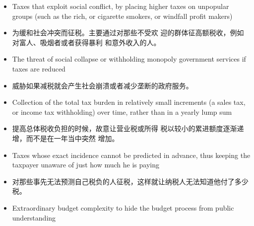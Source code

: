 \begin{paracol}{2}
\begin{itemize}
\end{itemize}
\switchcolumn*
\begin{itemize}
	\item Taxes that exploit social conflict, by placing higher taxes
	on unpopular groups (such as the rich, or cigarette smokers, or windfall profit makers)
\end{itemize}
\switchcolumn
\begin{itemize}
	\item 为缓和社会冲突而征税。主要通过对那些不受欢
	迎的群体征高额税收，例如对富人、吸烟者或者获得暴利
	和意外收入的人。
\end{itemize}
\switchcolumn*
\begin{itemize}
	\item The threat of social collapse or withholding monopoly
	government services if taxes are reduced
\end{itemize}
\switchcolumn
\begin{itemize}
	\item 威胁如果减税就会产生社会崩溃或者减少垄断的政府服务。
\end{itemize}
\switchcolumn*
\begin{itemize}
	\item Collection of the total tax burden in relatively small increments (a sales tax, or income tax withholding) over time,
	rather than in a yearly lump sum
\end{itemize}
\switchcolumn
\begin{itemize}
	\item 提高总体税收负担的时候，故意让营业税或所得
	税以较小的累进额度逐渐递增，而不是在一年当中突然
	增加。
\end{itemize}
\switchcolumn*
\begin{itemize}
	\item Taxes whose exact incidence cannot be predicted in advance, thus keeping the taxpayer unaware of just how
	much he is paying
\end{itemize}
\switchcolumn
\begin{itemize}
	\item 对那些事先无法预测自己税负的人征税，这样就让纳税人无法知道他付了多少税。
\end{itemize}
\switchcolumn*
\begin{itemize}
	\item Extraordinary budget complexity to hide the budget
	process from public understanding
\end{itemize}
\switchcolumn
\begin{itemize}

\end{itemize}
\end{paracol}
